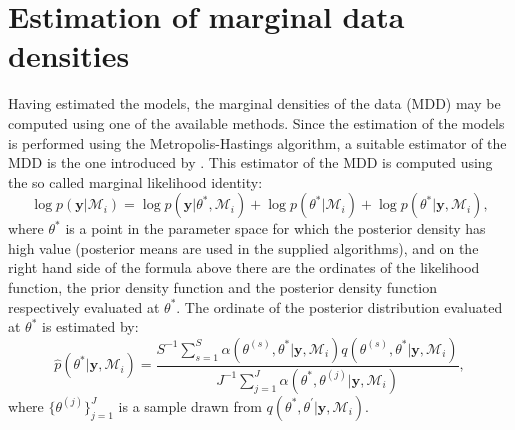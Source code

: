 \documentclass[final,3p,authoryear]{elsarticle}
\begin{document}
\section{Estimation of marginal data densities} Having estimated the models, the marginal densities of the data (MDD) may be computed using one of the available methods. Since the estimation of the models is performed using the Metropolis-Hastings algorithm, a suitable estimator of the MDD is the one introduced by \cite{Chib2001}. This estimator of the MDD is computed using the so called marginal likelihood identity:
\begin{equation}\label{eq:mli}
\log p\left( \mathbf{y}|\mathcal{M}_i \right) = \log p\left( \mathbf{y}|\theta^{*}, \mathcal{M}_i \right) + \log p\left( \theta^{*}| \mathcal{M}_i \right) + \log p\left( \theta^{*}|\mathbf{y}, \mathcal{M}_i \right),
\end{equation} 
where $\theta^{*}$ is a point in the parameter space for which the posterior density has high value (posterior means are used in the supplied algorithms), and on the right hand side of the formula above there are the ordinates of the likelihood function, the prior density function and the posterior density function respectively evaluated at $\theta^{*}$. %
The ordinate of the posterior distribution evaluated at $\theta^{*}$ is estimated by:
\begin{equation}\label{eq:cjpo}
\hat p\left(\theta^{*}|\mathbf{y},\mathcal{M}_i\right) = \frac{S^{-1} \sum_{s=1}^{S}\alpha(\theta^{(s)},\theta^{*}|\mathbf{y},\mathcal{M}_i)q(\theta^{(s)},\theta^{*}|\mathbf{y},\mathcal{M}_i)}{J^{-1}\sum_{j=1}^{J}\alpha(\theta^{*},\theta^{(j)}|\mathbf{y},\mathcal{M}_i)},
\end{equation}
where $\{\theta^{(j)}\}_{j=1}^{J}$ is a sample drawn from $q(\theta^{*},\theta^{'}|\mathbf{y},\mathcal{M}_i)$. %
\end{document}
